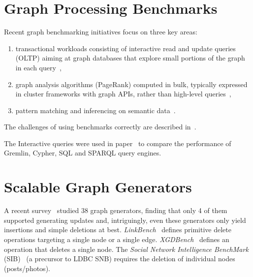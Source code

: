 
\section{Graph Processing Benchmarks}

Recent graph benchmarking initiatives focus on three key areas:

\begin{enumerate}
\item transactional workloads consisting of interactive read and update queries (OLTP) aiming at graph databases that explore small portions of the graph in each query~\cite{DBLP:conf/cidr/BarahmandG13,DBLP:conf/sigmod/ArmstrongPBC13,DBLP:journals/ase/DayarathnaS14,DBLP:conf/sigmod/ErlingALCGPPB15,DBLP:journals/pvldb/LissandriniBV18},
\item graph analysis algorithms (\eg PageRank) computed in bulk, typically expressed in cluster frameworks with graph APIs, rather than high-level queries~\cite{DBLP:conf/hipc/BaderM05,DBLP:conf/bigdataconf/ElserM13,DBLP:conf/sc/NaiXTKL15,DBLP:journals/pvldb/IosupHNHPMCCSAT16},
\item pattern matching and inferencing on semantic data~\cite{DBLP:journals/ws/GuoPH05,DBLP:books/sp/virgilio09/SchmidtHMPL09,DBLP:conf/semweb/MorseyLAN11,DBLP:conf/semweb/AlucHOD14,DBLP:journals/sosym/SzarnyasIRV18}.
\end{enumerate}

The challenges of using benchmarks correctly are described in~\cite{DBLP:conf/sigmod/RaasveldtHGM18}.

The Interactive queries were used in paper~\cite{DBLP:conf/grades/PacaciZLO17} to compare the performance of Gremlin, Cypher, SQL and SPARQL query engines.


\section{Scalable Graph Generators}


A recent survey~\cite{DBLP:journals/csur/BonifatiHPS20} studied 38 graph generators, finding that only 4 of them supported generating updates and, intriguingly, even these generators only yield insertions and simple deletions at best.
\emph{LinkBench}~\cite{DBLP:conf/sigmod/ArmstrongPBC13} defines primitive delete operations targeting a single node or a single edge.
\emph{XGDBench}~\cite{DBLP:journals/ase/DayarathnaS14} defines an operation that deletes a single node.
The \emph{Social Network Intelligence BenchMark} (SIB)~\cite{SIB} (a precursor to LDBC SNB) requires the deletion of individual nodes (posts/photos).
